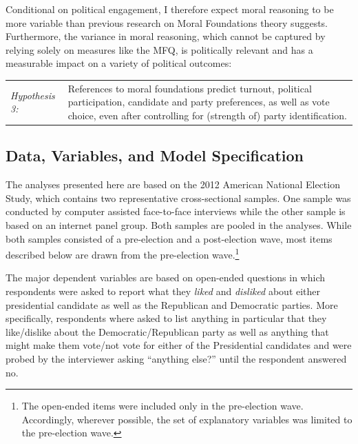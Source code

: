 \documentclass[12pt]{article}
\begin{document}
Conditional on political engagement, I therefore expect moral reasoning to be more variable than previous research on Moral Foundations theory suggests. Furthermore, the variance in moral reasoning, which cannot be captured by relying solely on measures like the MFQ, is politically relevant and has a measurable impact on a variety of political outcomes:

\vspace{0.3cm}
\begin{tabular}{lp{12cm}}
\textsl{Hypothesis 3:} & References to moral foundations predict turnout, political participation, candidate and party preferences, as well as vote choice, even after controlling for (strength of) party identification.
\end{tabular}
\vspace{0.5cm}


\subsection{Data, Variables, and Model Specification}

The analyses presented here are based on the 2012 American National Election Study, which contains two representative cross-sectional samples. One sample was conducted by computer assisted face-to-face interviews while the other sample is based on an internet panel group. Both samples are pooled in the analyses. While both samples consisted of a pre-election and a post-election wave, most items described below are drawn from the pre-election wave.\footnote{The open-ended items were included only in the pre-election wave. Accordingly, wherever possible, the set of explanatory variables was limited to the pre-election wave.}

The major dependent variables are based on open-ended questions in which respondents were asked to report what they \textit{liked} and \textit{disliked} about either presidential candidate as well as the Republican and Democratic parties. More specifically, respondents where asked to list anything in particular that they like/dislike about the Democratic/Republican party as well as anything that might make them vote/not vote for either of the Presidential candidates and were probed by the interviewer asking ``anything else?'' until the respondent answered no.
\end{document}
